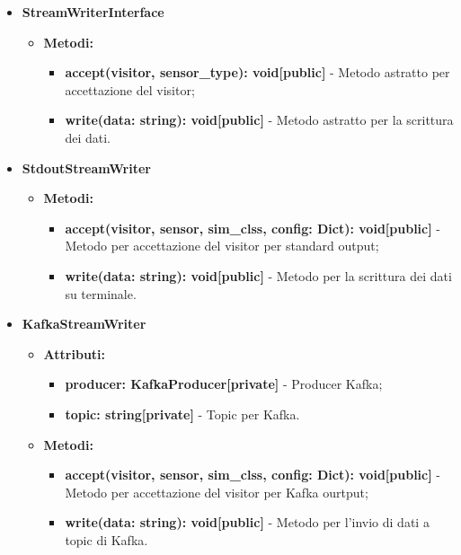 \documentclass[8pt]{article}
\begin{document}
\begin{itemize}
    \item \textbf{StreamWriterInterface}
    \begin{itemize}
        \item \textbf{Metodi:}
        \begin{itemize}
            \item \textbf{accept(visitor, sensor\_type): void[public]} - Metodo astratto per accettazione del visitor;
            \item \textbf{write(data: string): void[public]} - Metodo astratto per la scrittura dei dati.
        \end{itemize}
    \end{itemize}
    \item \textbf{StdoutStreamWriter}
    \begin{itemize}
        \item \textbf{Metodi:}
        \begin{itemize}
            \item \textbf{accept(visitor, sensor, sim\_clss, config: Dict): void[public]} - Metodo per accettazione del visitor per standard output;
            \item \textbf{write(data: string): void[public]} - Metodo per la scrittura dei dati su terminale.
        \end{itemize}
    \end{itemize}
    \item \textbf{KafkaStreamWriter}
    \begin{itemize}
        \item \textbf{Attributi:}
        \begin{itemize}
            \item \textbf{producer: KafkaProducer[private]} - Producer Kafka;
            \item \textbf{topic: string[private]} - Topic per Kafka.
        \end{itemize}
        \item \textbf{Metodi:}
        \begin{itemize}
            \item \textbf{accept(visitor, sensor, sim\_clss, config: Dict): void[public]} - Metodo per accettazione del visitor per Kafka ourtput;
            \item \textbf{write(data: string): void[public]} - Metodo per l'invio di dati a topic di Kafka.
        \end{itemize}
    \end{itemize}

\end{itemize}
\end{document}
